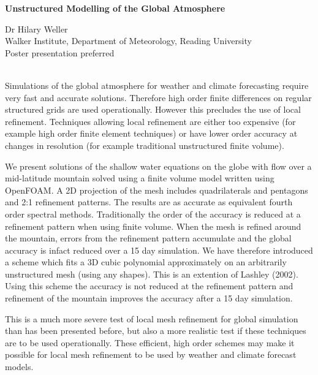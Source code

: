 \documentclass[a4paper,12pt]{article}
\begin{document}
{
   \centering 
   {
        \Large \bf
        Unstructured Modelling of the Global Atmosphere
        
   }
    Dr Hilary Weller \\
    Walker Institute, Department of Meteorology, Reading  University \\
    Poster presentation preferred \\ \ \\
}

Simulations of the global atmosphere for weather and climate forecasting require very fast and accurate solutions. Therefore high order finite differences on regular structured grids are used operationally. However this precludes the use of local refinement. Techniques allowing local refinement are either too expensive (for example high order finite element techniques) or have lower order accuracy at changes in resolution (for example traditional unstructured finite volume). 

We present solutions of the shallow water equations on the globe with flow over 
a mid-latitude mountain solved using a finite volume model written using OpenFOAM. A 2D projection of the mesh includes quadrilaterals and pentagons and 2:1 refinement patterns. The results are as accurate as equivalent fourth \hbox{order} spectral methods. Traditionally the order of the accuracy is reduced at a refinement pattern when using finite volume. When the mesh is refined around the mountain, errors from the refinement pattern accumulate and the global accuracy is infact reduced over a 15 day simulation. We have therefore introduced a scheme which fits a 3D cubic polynomial approximately on an arbitrarily unstructured mesh (using any shapes). This is an extention of Lashley (2002). Using this scheme the accuracy is not reduced at the refinement pattern and refinement of the mountain improves the accuracy after a 15 day simulation. 

This is a much more severe test of local mesh refinement for global simulation than has been presented before, but also a more realistic test if these techniques are to be used operationally. These efficient, high order schemes may make it possible for local mesh refinement to be used by weather and climate forecast models. 
\end{document}
